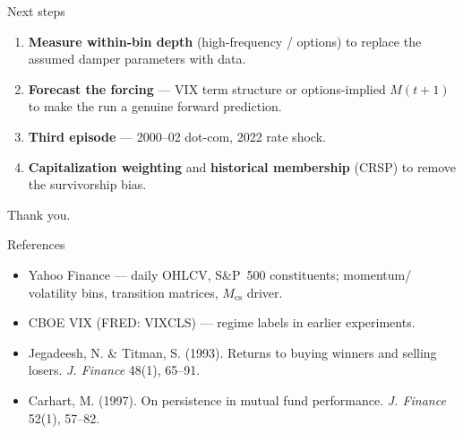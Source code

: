 \documentclass[10pt]{beamer}
\begin{document}
\begin{frame}{Next steps}
  \small
  \begin{enumerate}
    \item \textbf{Measure within-bin depth} (high-frequency / options) to
      replace the assumed damper parameters with data.
    \item \textbf{Forecast the forcing} --- VIX term structure or
      options-implied $M(t+1)$ to make the run a genuine forward prediction.
    \item \textbf{Third episode} --- 2000--02 dot-com, 2022 rate shock.
    \item \textbf{Capitalization weighting} and \textbf{historical membership}
      (CRSP) to remove the survivorship bias.
  \end{enumerate}
  \vspace{1em}
  \begin{center}
    \Large Thank you.
  \end{center}
\end{frame}

\begin{frame}{References}
  \footnotesize
  \begin{itemize}
    \item Yahoo Finance --- daily OHLCV, S\&P~500 constituents; momentum/
      volatility bins, transition matrices, $M_{\mathrm{cs}}$ driver.
    \item CBOE VIX (FRED: VIXCLS) --- regime labels in earlier experiments.
    \item Jegadeesh, N. \& Titman, S. (1993). Returns to buying winners and
      selling losers. \textit{J. Finance} 48(1), 65--91.
    \item Carhart, M. (1997). On persistence in mutual fund performance.
      \textit{J. Finance} 52(1), 57--82.
  \end{itemize}
\end{frame}
\end{document}
